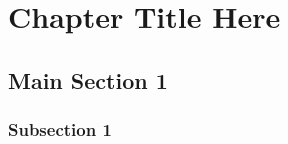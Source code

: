
\pagestyle{fancy}

\chapter{Chapter Title Here}
\label{ChapterX}


\section{Main Section 1}


\subsection{Subsection 1}
